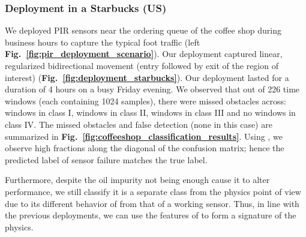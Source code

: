 \subsubsection{Deployment in a Starbucks (US)}\label{subsubsec:starbucks} 
%
We deployed PIR sensors near the ordering queue of the coffee shop during business hours to capture the typical foot traffic (left {\bfseries Fig.~\ref{fig:pir_deployment_scenario}}). 
Our deployment %
captured linear, regularized bidirectional movement (entry followed by exit of the region of interest) ({\bfseries Fig.~\ref{fig:deployment_starbucks}}).
%
Our deployment lasted for a duration of 4 hours on a busy Friday evening. 
We observed that out of 226 time windows (each containing 1024 samples), there were missed obstacles across:  windows in class I,  windows in class II,  windows in class III and no windows in class IV. 
%
The missed obstacles and false detection (none in this case) are summarized in {\bfseries Fig.~\ref{fig:coffeeshop_classification_results}}. 
%
Using \sol, we observe high fractions along the diagonal of the confusion matrix; hence the predicted label of sensor failure matches the true label.

Furthermore, despite the oil impurity not being enough cause it to alter performance, we still classify it is a separate class from the physics point of view due to its different behavior of \aout from that of a working sensor.
Thus, in line with the previous deployments, we can use the features of \aout to form a signature of the physics. %



